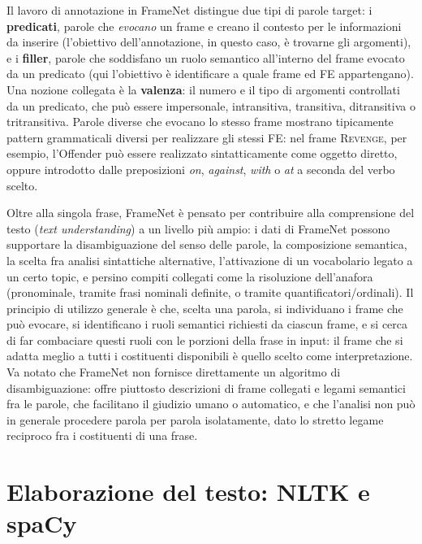 \documentclass[11pt,a4paper]{report}
\begin{document}
Il lavoro di annotazione in FrameNet distingue due tipi di parole target: i \textbf{predicati}, parole che \emph{evocano} un frame e creano il contesto per le informazioni da inserire (l'obiettivo dell'annotazione, in questo caso, è trovarne gli argomenti), e i \textbf{filler}, parole che soddisfano un ruolo semantico all'interno del frame evocato da un predicato (qui l'obiettivo è identificare a quale frame ed FE appartengano). Una nozione collegata è la \textbf{valenza}: il numero e il tipo di argomenti controllati da un predicato, che può essere impersonale, intransitiva, transitiva, ditransitiva o tritransitiva. Parole diverse che evocano lo stesso frame mostrano tipicamente pattern grammaticali diversi per realizzare gli stessi FE: nel frame \textsc{Revenge}, per esempio, l'Offender può essere realizzato sintatticamente come oggetto diretto, oppure introdotto dalle preposizioni \emph{on}, \emph{against}, \emph{with} o \emph{at} a seconda del verbo scelto.

Oltre alla singola frase, FrameNet è pensato per contribuire alla comprensione del testo (\emph{text understanding}) a un livello più ampio: i dati di FrameNet possono supportare la disambiguazione del senso delle parole, la composizione semantica, la scelta fra analisi sintattiche alternative, l'attivazione di un vocabolario legato a un certo topic, e persino compiti collegati come la risoluzione dell'anafora (pronominale, tramite frasi nominali definite, o tramite quantificatori/ordinali). Il principio di utilizzo generale è che, scelta una parola, si individuano i frame che può evocare, si identificano i ruoli semantici richiesti da ciascun frame, e si cerca di far combaciare questi ruoli con le porzioni della frase in input: il frame che si adatta meglio a tutti i costituenti disponibili è quello scelto come interpretazione. Va notato che FrameNet non fornisce direttamente un algoritmo di disambiguazione: offre piuttosto descrizioni di frame collegati e legami semantici fra le parole, che facilitano il giudizio umano o automatico, e che l'analisi non può in generale procedere parola per parola isolatamente, dato lo stretto legame reciproco fra i costituenti di una frase.

\chapter{Elaborazione del testo: NLTK e spaCy}
\end{document}
